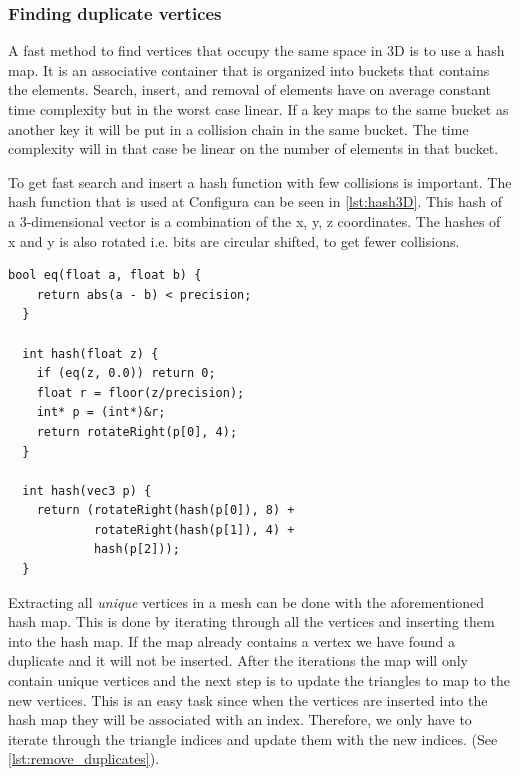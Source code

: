 \begin{subs}
\subsubsection{Finding duplicate vertices}
A fast method to find vertices that occupy the same space in 3D is to use a hash map. It is an associative container that is organized into buckets that contains the elements. Search, insert, and removal of elements have on average constant time complexity but in the worst case linear. If a key maps to the same bucket as another key it will be put in a collision chain in the same bucket. The time complexity will in that case be linear on the number of elements in that bucket.

To get fast search and insert a hash function with few collisions is important. The hash function that is used at Configura can be seen in \cref{lst:hash3D}. This hash of a 3-dimensional vector is a combination of the x, y, z coordinates. The hashes of x and y is also rotated i.e. bits are circular shifted, to get fewer collisions. 

\begin{minipage}{\textwidth}
\begin{lstlisting}[caption={Hashing 3D point}, label={lst:hash3D}]
  bool eq(float a, float b) {
    return abs(a - b) < precision;
  }
  
  int hash(float z) {
    if (eq(z, 0.0)) return 0;
    float r = floor(z/precision);
    int* p = (int*)&r;
    return rotateRight(p[0], 4);
  }
  
  int hash(vec3 p) {
    return (rotateRight(hash(p[0]), 8) +
            rotateRight(hash(p[1]), 4) +
            hash(p[2]));
  }
\end{lstlisting}
\end{minipage}

Extracting all \emph{unique} vertices in a mesh can be done with the aforementioned hash map. This is done by iterating through all the vertices and inserting them into the hash map. If the map already contains a vertex we have found a duplicate and it will not be inserted. After the iterations the map will only contain unique vertices and the next step is to update the triangles to map to the new vertices. This is an easy task since when the vertices are inserted into the hash map they will be associated with an index. Therefore, we only have to iterate through the triangle indices and update them with the new indices. (See \cref{lst:remove_duplicates}).


\end{subs}
